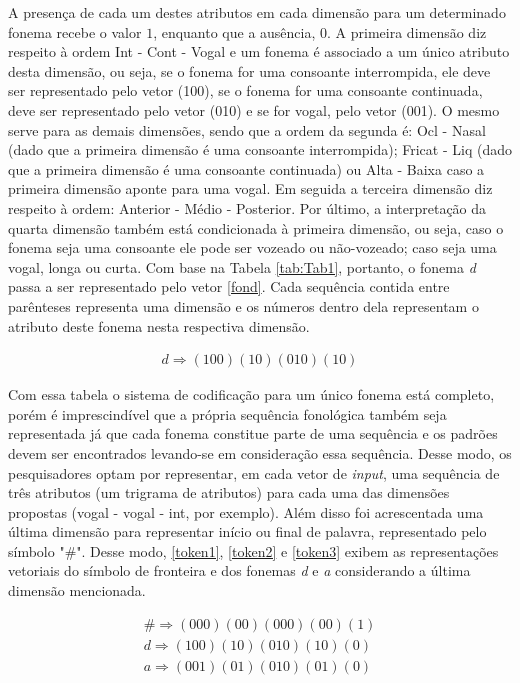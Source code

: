 A presença de cada um destes atributos em cada dimensão para um determinado fonema recebe o valor $1$, enquanto que a ausência, $0$. A primeira dimensão diz respeito à ordem Int - Cont - Vogal e um fonema é associado a um único atributo desta dimensão, ou seja, se o fonema for uma consoante interrompida, ele deve ser representado pelo vetor (100), se o fonema for uma consoante continuada, deve ser representado pelo vetor (010) e se for vogal, pelo vetor (001). O mesmo serve para as demais dimensões, sendo que a ordem da segunda é: Ocl - Nasal (dado que a primeira dimensão é uma consoante interrompida); Fricat - Liq (dado que a primeira dimensão é uma consoante continuada) ou Alta - Baixa caso a primeira dimensão aponte para uma vogal. Em seguida a terceira dimensão diz respeito à ordem: Anterior - Médio - Posterior. Por último, a interpretação da quarta dimensão também está condicionada à primeira dimensão, ou seja, caso o fonema seja uma consoante ele pode ser vozeado ou não-vozeado; caso seja uma vogal, longa ou curta. 
Com base na Tabela \ref{tab:Tab1}, portanto, o fonema \textit{d} passa a ser representado pelo vetor \ref{fond}. Cada sequência contida entre parênteses representa uma dimensão e os números dentro dela representam o atributo deste fonema nesta respectiva dimensão.

\begin{align}
d \Rightarrow (100)(10)(010)(10)\label{fond}
\end{align}

Com essa tabela o sistema de codificação para um único fonema está completo, porém é imprescindível que a própria sequência fonológica também seja representada já que cada fonema constitue parte de uma sequência e os padrões devem ser encontrados levando-se em consideração essa sequência. Desse modo, os pesquisadores optam por representar, em cada vetor de \textit{input}, uma sequência de três atributos (um trigrama de atributos) para cada uma das dimensões propostas (vogal - vogal - int, por exemplo). Além disso foi acrescentada uma última dimensão para representar início ou final de palavra, representado pelo símbolo "\#". Desse modo, \ref{token1}, \ref{token2} e \ref{token3} exibem as representações vetoriais do símbolo de fronteira e dos fonemas \textit{d} e \textit{a} considerando a última dimensão mencionada.

\begin{align}
\# \Rightarrow (000)(00)(000)(00)(1)\label{token1}\\
d \Rightarrow (100)(10)(010)(10)(0)\label{token2}\\
a \Rightarrow (001)(01)(010)(01)(0)\label{token3}
\end{align}

